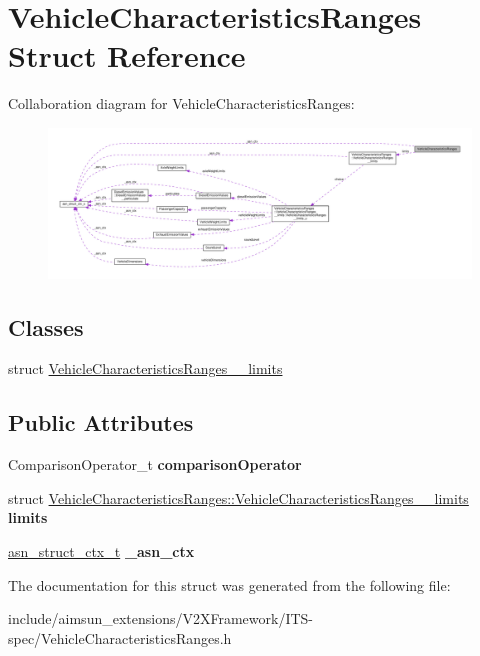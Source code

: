 \hypertarget{structVehicleCharacteristicsRanges}{}\section{Vehicle\+Characteristics\+Ranges Struct Reference}
\label{structVehicleCharacteristicsRanges}


Collaboration diagram for Vehicle\+Characteristics\+Ranges\+:\nopagebreak
\begin{figure}[H]
\begin{center}
\leavevmode
\includegraphics[width=350pt]{structVehicleCharacteristicsRanges__coll__graph}
\end{center}
\end{figure}
\subsection*{Classes}
\begin{DoxyCompactItemize}
\item 
struct \hyperlink{structVehicleCharacteristicsRanges_1_1VehicleCharacteristicsRanges____limits}{Vehicle\+Characteristics\+Ranges\+\_\+\+\_\+limits}
\end{DoxyCompactItemize}
\subsection*{Public Attributes}
\begin{DoxyCompactItemize}
\item 
Comparison\+Operator\+\_\+t {\bfseries comparison\+Operator}\hypertarget{structVehicleCharacteristicsRanges_a21102283d9056b50a2e94582d0cc31a3}{}\label{structVehicleCharacteristicsRanges_a21102283d9056b50a2e94582d0cc31a3}

\item 
struct \hyperlink{structVehicleCharacteristicsRanges_1_1VehicleCharacteristicsRanges____limits}{Vehicle\+Characteristics\+Ranges\+::\+Vehicle\+Characteristics\+Ranges\+\_\+\+\_\+limits} {\bfseries limits}\hypertarget{structVehicleCharacteristicsRanges_a0e17f55e020a9475f57bc28460d25864}{}\label{structVehicleCharacteristicsRanges_a0e17f55e020a9475f57bc28460d25864}

\item 
\hyperlink{structasn__struct__ctx__s}{asn\+\_\+struct\+\_\+ctx\+\_\+t} {\bfseries \+\_\+asn\+\_\+ctx}\hypertarget{structVehicleCharacteristicsRanges_a36f0925bac2788932b5cb9a1f7146e47}{}\label{structVehicleCharacteristicsRanges_a36f0925bac2788932b5cb9a1f7146e47}

\end{DoxyCompactItemize}


The documentation for this struct was generated from the following file\+:\begin{DoxyCompactItemize}
\item 
include/aimsun\+\_\+extensions/\+V2\+X\+Framework/\+I\+T\+S-\/spec/Vehicle\+Characteristics\+Ranges.\+h\end{DoxyCompactItemize}
